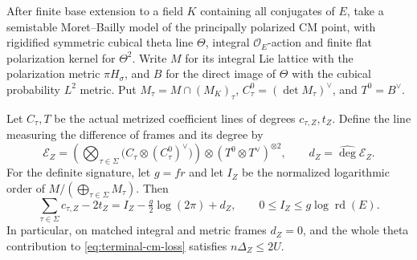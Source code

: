 \begin{auxlemma}\label{lem:terminal-principal-theta-comparison}
After finite base extension to a field \(K\) containing all conjugates of \(E\), take a semistable Moret--Bailly model of the principally polarized CM point, with rigidified symmetric cubical theta line \(\Theta\), integral \(\mathcal O_E\)-action and finite flat polarization kernel for \(\Theta^2\). Write \(M\) for its integral Lie lattice with the polarization metric \(\pi H_\sigma\), and \(B\) for the direct image of \(\Theta\) with the cubical probability \(L^2\) metric. Put \(M_\tau=M\cap(M_K)_\tau\), \(C_\tau^0=(\det M_\tau)^\vee\), and \(T^0=B^\vee\).

Let \(C_\tau,T\) be the actual metrized coefficient lines of degrees \(c_{\tau,Z},t_Z\). Define the line measuring the difference of frames and its degree by
\[
 \mathcal E_Z=\left(\bigotimes_{\tau\in\Sigma}\bigl(C_\tau\otimes(C_\tau^0)^\vee\bigr)\right)
             \otimes(T^0\otimes T^\vee)^{\otimes2},
     \qquad d_Z=\widehat{\deg}\mathcal E_Z .
\]
For the definite signature, let \(g=fr\) and let \(I_Z\) be the normalized logarithmic order of \(M/(\bigoplus_{\tau\in\Sigma}M_\tau)\). Then
\begin{equation}\label{eq:terminal-theta-frame-defect}
 \sum_{\tau\in\Sigma}c_{\tau,Z}-2t_Z
      = I_Z-\tfrac g2\log(2\pi)+d_Z,\qquad
      0\le I_Z\le g\log\operatorname{rd}(E).
\end{equation}
In particular, on matched integral and metric frames \(d_Z=0\), and the whole theta contribution to \eqref{eq:terminal-cm-loss} satisfies \(n\Delta_Z\le2U\).
\end{auxlemma}
